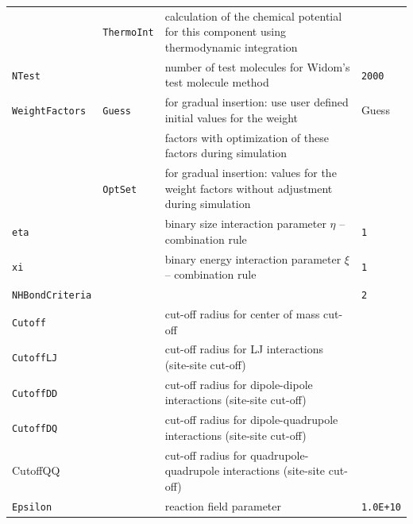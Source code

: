\begin{landscape}
\begin{longtable}{llll}
		& \texttt{ThermoInt}   & calculation of the chemical potential for this component using thermodynamic integration  & \\
		\texttt{NTest}                      &           & number of test molecules for Widom's test molecule method & \texttt{2000} \\
		\texttt{WeightFactors}              & \texttt{Guess}     & for gradual insertion: use user defined initial values for the weight   & Guess \\
		&&factors with optimization of these factors during simulation &\\
		\onehalfspacing            & \texttt{OptSet}    & for gradual insertion: values for the weight factors without adjustment during simulation                                  &       \\
		\midrule
		\texttt{eta} & & binary size interaction parameter $\eta$ -- combination rule & \texttt{1}\\
		\texttt{xi} & & binary energy interaction parameter $\xi$ -- combination rule & \texttt{1}\\
		\midrule
		\texttt{NHBondCriteria} & & & \texttt{2}\\
		\midrule
		\texttt{Cutoff}                     &           & cut-off radius for center of mass cut-off                 &       \\
		\texttt{CutoffLJ}                   &           & cut-off radius for LJ interactions (site-site cut-off)    &       \\
		\texttt{CutoffDD}                   &           & cut-off radius for dipole-dipole interactions (site-site cut-off)         &       \\
		\texttt{CutoffDQ}                   &           & cut-off radius for dipole-quadrupole interactions (site-site cut-off)     &       \\
		\onehalfspacing CutoffQQ   &           & cut-off radius for quadrupole-quadrupole interactions (site-site cut-off) &       \\
		\midrule
		\onehalfspacing \texttt{Epsilon}    &           & reaction field parameter         & \texttt{1.0E+10}
		\label{tab_KeywordsParFile}
	\end{longtable}
\end{landscape}









